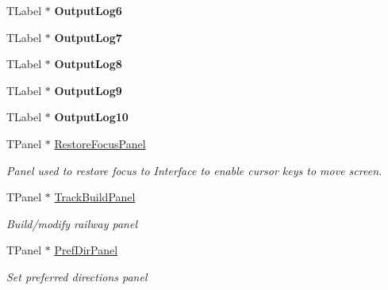 \begin{DoxyCompactItemize}
\mbox{\label{class_t_interface_a83cc8959039ebd2801293737008b0c4d}} 
T\+Label $\ast$ {\bfseries Output\+Log6}
\item 
\mbox{\label{class_t_interface_a271b2ef7478f7c5d07aea58271ae96b6}} 
T\+Label $\ast$ {\bfseries Output\+Log7}
\item 
\mbox{\label{class_t_interface_ae67f57427edf35cd3bb615c75a5b9790}} 
T\+Label $\ast$ {\bfseries Output\+Log8}
\item 
\mbox{\label{class_t_interface_a3f1cf2924a88667c4565f83a453adf93}} 
T\+Label $\ast$ {\bfseries Output\+Log9}
\item 
\mbox{\label{class_t_interface_ab945e5a071f603efbb7c2e04987ffba0}} 
T\+Label $\ast$ {\bfseries Output\+Log10}
\item 
\mbox{\label{class_t_interface_a292e63f2a8e9e2b4ca066056d3bd5870}} 
T\+Panel $\ast$ \mbox{\hyperlink{class_t_interface_a292e63f2a8e9e2b4ca066056d3bd5870}{Restore\+Focus\+Panel}}
\begin{DoxyCompactList}\small\item\em Panel used to restore focus to Interface to enable cursor keys to move screen. \end{DoxyCompactList}\item 
\mbox{\label{class_t_interface_a203c81dcf5ac3ae820cf17f6dfd21fff}} 
T\+Panel $\ast$ \mbox{\hyperlink{class_t_interface_a203c81dcf5ac3ae820cf17f6dfd21fff}{Track\+Build\+Panel}}
\begin{DoxyCompactList}\small\item\em \textquotesingle{}Build/modify railway\textquotesingle{} panel \end{DoxyCompactList}\item 
\mbox{\label{class_t_interface_a5fb96e72a347625f8fa80bc88144842d}} 
T\+Panel $\ast$ \mbox{\hyperlink{class_t_interface_a5fb96e72a347625f8fa80bc88144842d}{Pref\+Dir\+Panel}}
\begin{DoxyCompactList}\small\item\em \textquotesingle{}Set preferred directions\textquotesingle{} panel \end{DoxyCompactList}\item 

\end{DoxyCompactItemize}
